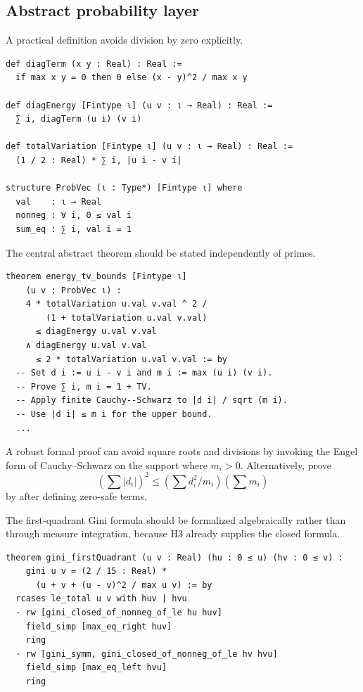 \documentclass[11pt,oneside]{article}
\theoremstyle{research}
\theoremstyle{definition}
\newcommand{\code}[1]{\texttt{\detokenize{#1}}}
\begin{document}
\subsection{Abstract probability layer}

A practical definition avoids division by zero explicitly.

\begin{lstlisting}[language={},caption={Lean-style specification of the
energy and total variation.}]
def diagTerm (x y : Real) : Real :=
  if max x y = 0 then 0 else (x - y)^2 / max x y

def diagEnergy [Fintype ι] (u v : ι → Real) : Real :=
  ∑ i, diagTerm (u i) (v i)

def totalVariation [Fintype ι] (u v : ι → Real) : Real :=
  (1 / 2 : Real) * ∑ i, |u i - v i|

structure ProbVec (ι : Type*) [Fintype ι] where
  val    : ι → Real
  nonneg : ∀ i, 0 ≤ val i
  sum_eq : ∑ i, val i = 1
\end{lstlisting}

The central abstract theorem should be stated independently of primes.

\begin{lstlisting}[language={},caption={Target statement for the
energy--variation comparison.}]
theorem energy_tv_bounds [Fintype ι]
    (u v : ProbVec ι) :
    4 * totalVariation u.val v.val ^ 2 /
        (1 + totalVariation u.val v.val)
      ≤ diagEnergy u.val v.val
    ∧ diagEnergy u.val v.val
      ≤ 2 * totalVariation u.val v.val := by
  -- Set d i := u i - v i and m i := max (u i) (v i).
  -- Prove ∑ i, m i = 1 + TV.
  -- Apply finite Cauchy--Schwarz to |d i| / sqrt (m i).
  -- Use |d i| ≤ m i for the upper bound.
  ...
\end{lstlisting}

A robust formal proof can avoid square roots and divisions by invoking the
Engel form of Cauchy--Schwarz on the support where $m_i>0$.  Alternatively,
prove
\[
 \left(\sum |d_i|\right)^2
 \le\left(\sum d_i^2/m_i\right)\left(\sum m_i\right)
\]
by \code{Finset.sum_mul_sq_le_sq_mul_sq} after defining zero-safe terms.

The first-quadrant Gini formula should be formalized algebraically rather than
through measure integration, because H3 already supplies the closed formula.

\begin{lstlisting}[language={},caption={Algebraic first-quadrant identity.}]
theorem gini_firstQuadrant (u v : Real) (hu : 0 ≤ u) (hv : 0 ≤ v) :
    gini u v = (2 / 15 : Real) *
      (u + v + (u - v)^2 / max u v) := by
  rcases le_total u v with huv | hvu
  · rw [gini_closed_of_nonneg_of_le hu huv]
    field_simp [max_eq_right huv]
    ring
  · rw [gini_symm, gini_closed_of_nonneg_of_le hv hvu]
    field_simp [max_eq_left hvu]
    ring
\end{lstlisting}
\end{document}
